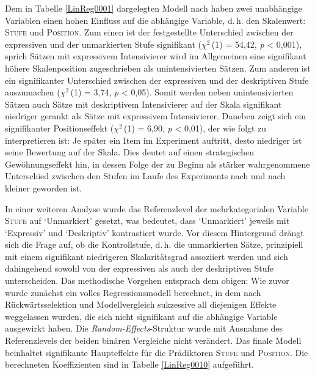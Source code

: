 \noindent Dem in Tabelle \ref{LinReg0001} dargelegten Modell nach haben zwei unabhängige Variablen einen hohen Einfluss auf die abhängige Variable, d.\,h. den Skalenwert: \textsc{Stufe} und \textsc{Position}. Zum einen ist der festgestellte Unterschied zwischen der expressiven und der unmarkierten Stufe signifikant {($\chi$$^{2}$\,(1) = 54,42}, {\textit{p} < 0,001}), sprich Sätzen mit expressivem Intensivierer wird im Allgemeinen eine signifikant höhere Skalenposition zugeschrieben als unintensivierten Sätzen. Zum anderen ist ein signifikanter Unterschied zwischen der expressiven und der deskriptiven Stufe auszumachen {($\chi$$^{2}$\,(1) = 3,74}, \textit{p} < 0,05). Somit werden neben unintensivierten Sätzen auch Sätze mit deskriptivem Intensivierer auf der Skala signifikant niedriger gerankt als Sätze mit expressivem Intensivierer. Daneben zeigt sich ein signifikanter Positionseffekt ({$\chi$$^{2}$\,(1) = 6,90}, {\textit{p} < 0,01}), der wie folgt zu interpretieren ist: Je später ein Item im Experiment auftritt, desto niedriger ist seine Bewertung auf der Skala. Dies deutet auf einen strategischen Gewöhnungseffekt hin, in dessen Folge der zu Beginn als stärker wahrgenommene Unterschied zwischen den Stufen im Laufe des Experiments nach und nach kleiner geworden ist.


In einer weiteren Analyse wurde das Referenzlevel der mehrkategorialen Variable \textsc{Stufe} auf `Unmarkiert' gesetzt, was bedeutet, dass `Unmarkiert' jeweils mit `Expressiv' und `Deskriptiv' kontrastiert wurde. Vor diesem Hintergrund drängt sich die Frage auf, ob die Kontrollstufe, d.\,h. die unmarkierten Sätze, prinzipiell mit einem signifikant niedrigeren Skalaritätsgrad assoziiert werden und sich dahingehend sowohl von der expressiven als auch der deskriptiven Stufe unterscheiden. Das methodische Vorgehen entsprach dem obigen: Wie zuvor wurde zunächst ein volles Regressionsmodell berechnet, in dem nach Rückwärtsselektion und Modellvergleich sukzessive all diejenigen Effekte weggelassen wurden, die sich nicht signifikant auf die abhängige Variable ausgewirkt haben. Die \textit{Random-Effects}-Struktur wurde mit Ausnahme des Referenzlevels der beiden binären Vergleiche nicht verändert. Das finale Modell beinhaltet signifikante Haupteffekte für die Prädiktoren \textsc{Stufe} und \textsc{Position}. Die berechneten Koeffizienten sind in {Tabelle \ref{LinReg0010}} {aufgeführt}.

